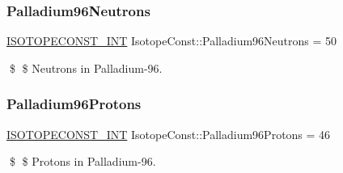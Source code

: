 \subsubsection{\texorpdfstring{Palladium96\+Neutrons}{Palladium96Neutrons}}
{\footnotesize\ttfamily \mbox{\hyperlink{group___isotope_const-_macros_ga5f18360b3e99483a35c32d789e62621c}{I\+S\+O\+T\+O\+P\+E\+C\+O\+N\+S\+T\+\_\+\+I\+NT}} Isotope\+Const\+::\+Palladium96\+Neutrons = 50}

\$ \$ Neutrons in Palladium-\/96. \mbox{\label{group___isotope_const-_palladium-_pd96_ga95a30d90cb9aea2b2d824d07db248383}} 
\subsubsection{\texorpdfstring{Palladium96\+Protons}{Palladium96Protons}}
{\footnotesize\ttfamily \mbox{\hyperlink{group___isotope_const-_macros_ga5f18360b3e99483a35c32d789e62621c}{I\+S\+O\+T\+O\+P\+E\+C\+O\+N\+S\+T\+\_\+\+I\+NT}} Isotope\+Const\+::\+Palladium96\+Protons = 46}

\$ \$ Protons in Palladium-\/96. 